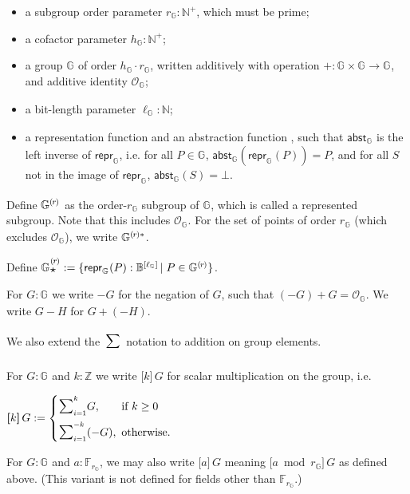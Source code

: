 \documentclass{article}
\newcommand{\typecolon}{:}
\newcommand{\bit}{\mathbb{B}}
\newcommand{\Nat}{\mathbb{N}}
\newcommand{\PosInt}{\mathbb{N}^+}
\newcommand{\Int}{\mathbb{Z}}
\newcommand{\Field}[1]{\mathbb{F}_{\!#1}}
\newcommand{\typeexp}[2]{{#1}\vphantom{)}^{[{#2}]}}
\newcommand{\bitseq}[1]{\typeexp{\bit}{#1}}
\newcommand{\squash}{\!\!\!}
\newcommand{\caseif}{\squash\text{if }}
\newcommand{\caseotherwise}{\squash\text{otherwise}}
\newcommand{\setof}[1]{\{{#1}\}}
\newcommand{\vop}[3]{\,\raisebox{0.29ex}{\scalebox{0.89}{$\smashoperator[r]{#3_{#1}^{#2}}$\,}}}
\newcommand{\sop}[3]{\!\scalebox{0.89}{$\scalebox{1.404}{$\strut#3$}_{#1}^{#2}$}}
\newcommand{\vsum}[2]{\vop{#1}{#2}{\sum}}
\newcommand{\ssum}[2]{\sop{#1}{#2}{\sum}}
\newcommand{\mult}{\cdot}
\newcommand{\scalarmult}[2]{\boldsymbol{[}{#1}\boldsymbol{]}\,{#2}}
\newcommand{\union}{\cup}
\newcommand{\suchthat}{\,\vert\;}
\newcommand{\maybe}[1]{{#1} \union \setof{\bot}}
\newcommand{\Repr}{\star}
\newcommand{\MakeRepr}[2]{{#1}\rlap{\raisebox{-0.32ex}{$\Repr$}}\rule{0ex}{2.2ex}^{#2}}
\newcommand{\Zero}{\mathcal{O}}
\newcommand{\subgroupr}{(\kern-0.075emr\kern-0.075em)}
\newcommand{\ParamG}[1]{{{#1}_\mathbb{G}}}
\newcommand{\GroupG}[1]{\mathbb{G}_{#1}}
\newcommand{\SubgroupG}[1]{\GroupG{#1}^{\subgroupr}}
\newcommand{\SubgroupGstar}[1]{\GroupG{#1}^{\subgroupr\ast}}
\newcommand{\SubgroupReprG}{\MakeRepr{\GroupG{}}{\subgroupr}}
\newcommand{\ZeroG}[1]{\Zero_{\GroupG{#1}}}
\newcommand{\ellG}[1]{\ell_{\GroupG{#1}}}
\newcommand{\ReprG}[1]{\bitseq{\ellG{#1}}}
\newcommand{\reprG}[1]{\repr_{\GroupG{#1}}}
\newcommand{\abstG}[1]{\abst_{\GroupG{#1}}}
\newcommand{\repr}{\mathsf{repr}}
\newcommand{\abst}{\mathsf{abst}}
\begin{document}
\begin{itemize}
  \item a subgroup order parameter $\ParamG{r} \typecolon \PosInt$, which must be prime;
  \item a cofactor parameter $\ParamG{h} \typecolon \PosInt$;
  \item a group $\GroupG{}$ of order $\ParamG{h} \mult \ParamG{r}$, written additively
        with operation $+ \typecolon \GroupG{} \times \GroupG{} \rightarrow \GroupG{}$,
        and additive identity $\ZeroG{}$;
  \item a bit-length parameter $\ellG{} \typecolon \Nat$;
  \item a representation function \smash{$\reprG{} \typecolon \GroupG{} \rightarrow \bitseq{\ellG{}}$}
        and an abstraction function \smash{$\abstG{} \typecolon \bitseq{\ellG{}} \rightarrow \maybe{\GroupG{}}$},
        such that $\abstG{}$ is the left inverse of $\reprG{}$, i.e. for all $P \in \GroupG{}$,
        $\abstG{}(\reprG{}(P)) = P$, and for all $S$ not in the image of $\reprG{}$, $\abstG{}(S) = \bot$.
\end{itemize}

Define $\SubgroupG{}$ as the order-$\ParamG{r}$ subgroup of $\GroupG{}$, which is called a
represented subgroup. Note that this includes $\ZeroG{}$.
For the set of points of order $\ParamG{r}$ (which excludes $\ZeroG{}$), we write $\SubgroupGstar{}$.

Define $\SubgroupReprG := \setof{\reprG{}(P) \typecolon \ReprG{} \suchthat P \in \SubgroupG{}}$.

For $G \typecolon \GroupG{}$ we write $-G$ for the negation of $G$, such that
$(-G) + G = \ZeroG{}$. We write $G - H$ for $G + (-H)$.

We also extend the $\vsum{}{}$ notation to addition on group elements.

For $G \typecolon \GroupG{}$ and $k \typecolon \Int$ we write $\scalarmult{k}{G}$
for scalar multiplication on the group, i.e.

\begin{formulae}
  \item $\scalarmult{k}{G} := \begin{cases}
          \ssum{i = 1}{k} G, &\caseif k \geq 0 \\[1.5ex]
          \ssum{i = 1}{-k} (-G), &\caseotherwise.
        \end{cases}$
\end{formulae}

For $G \typecolon \GroupG{}$ and $a \typecolon \Field{\ParamG{r}}$, we may also write
$\scalarmult{a}{G}$ meaning $\scalarmult{a \bmod \ParamG{r}}{G}$ as defined above.
(This variant is not defined for fields other than $\Field{\ParamG{r}}$.)
\end{document}
